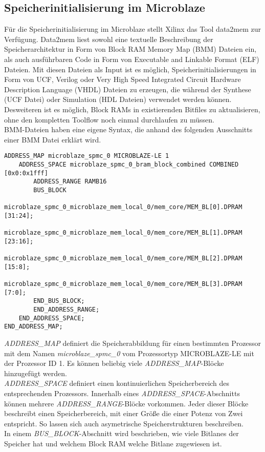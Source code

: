 \subsection{Speicherinitialisierung im Microblaze} \label{subsec:MemInitBMM}
Für die Speicherinitialisierung im Microblaze stellt Xilinx das Tool data2mem zur Verfügung. \cite{DATA2MEM}
Data2mem liest sowohl eine textuelle Beschreibung der Speicherarchitektur in Form von Block RAM Memory Map (BMM) Dateien ein, als auch ausführbaren Code in Form von Executable and Linkable Format (ELF) Dateien. Mit diesen Dateien als Input ist es möglich, Speicherinitialisierungen in Form von UCF, Verilog oder Very High Speed Integrated Circuit Hardware Description Language (VHDL) Dateien zu erzeugen, die während der Synthese (UCF Datei) oder Simulation (HDL Dateien) verwendet werden können. Desweiteren ist es möglich, Block RAMs in existierenden Bitfiles zu aktualisieren, ohne den kompletten Toolflow noch einmal durchlaufen zu müssen.\\
BMM-Dateien haben eine eigene Syntax, die anhand des folgenden Ausschnitts einer BMM Datei erklärt wird.
\newpage
\begin{lstlisting}
ADDRESS_MAP microblaze_spmc_0 MICROBLAZE-LE 1
	ADDRESS_SPACE microblaze_spmc_0_bram_block_combined COMBINED [0x0:0x1fff]
		ADDRESS_RANGE RAMB16
		BUS_BLOCK
			microblaze_spmc_0_microblaze_mem_local_0/mem_core/MEM_BL[0].DPRAM [31:24];
			microblaze_spmc_0_microblaze_mem_local_0/mem_core/MEM_BL[1].DPRAM [23:16];
			microblaze_spmc_0_microblaze_mem_local_0/mem_core/MEM_BL[2].DPRAM [15:8];
			microblaze_spmc_0_microblaze_mem_local_0/mem_core/MEM_BL[3].DPRAM [7:0];
		END_BUS_BLOCK;
		END_ADDRESS_RANGE;
	END_ADDRESS_SPACE;
END_ADDRESS_MAP;
\end{lstlisting}
\textit{ADDRESS\_MAP} definiert die Speicherabbildung für einen bestimmten Prozessor mit dem Namen \textit{microblaze\_spmc\_0} vom Prozessortyp MICROBLAZE-LE mit der Prozessor ID 1. Es können beliebig viele \textit{ADDRESS\_MAP}-Blöcke hinzugefügt werden.\\ \textit{ADDRESS\_SPACE} definiert einen kontinuierlichen Speicherbereich des entsprechenden Prozessors. Innerhalb eines \textit{ADDRESS\_SPACE}-Abschnitts können mehrere \textit{ADDRESS\_RANGE}-Blöcke vorkommen. Jeder dieser Blöcke beschreibt einen Speicherbereich, mit einer Größe die einer Potenz von Zwei entspricht. So lassen sich auch asymetrische Speicherstrukturen beschreiben.\\
In einem \textit{BUS\_BLOCK}-Abschnitt wird beschrieben, wie viele Bitlanes der Speicher hat und welchem Block RAM welche Bitlane zugewiesen ist.